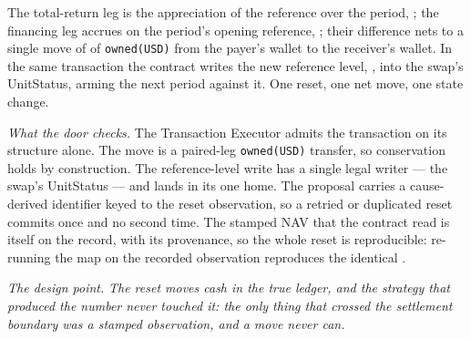 The total-return leg is the appreciation of the reference over the period,
; the financing leg accrues on the period's opening reference,
; their difference nets to a single move of  of
\texttt{owned(USD)} from the payer's wallet to the receiver's wallet. In the same
transaction the contract writes the new reference level, ,
into the swap's UnitStatus, arming the next period against it. One reset, one net
move, one state change.

\emph{What the door checks.} The Transaction Executor admits the transaction on
its structure alone. The  move is a paired-leg
\texttt{owned(USD)} transfer, so conservation holds by construction. The
reference-level write has a single legal writer --- the swap's UnitStatus --- and
lands in its one home. The proposal carries a cause-derived identifier keyed to
the reset observation, so a retried or duplicated reset commits once and no
second time. The stamped NAV that the contract read is itself on the record, with
its provenance, so the whole reset is reproducible: re-running the map on the
recorded observation reproduces the identical .

\emph{The design point.} \emph{The reset moves cash in the true ledger, and the
strategy that produced the number never touched it: the only thing that crossed
the settlement boundary was a stamped observation, and a move never can.}
